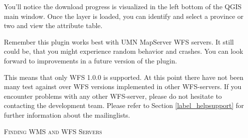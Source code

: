 You'll notice the download progress is visualized in the left bottom of the QGIS main window. 
Once the layer is loaded, you can identify and select a province or two and view the 
attribute table.

Remember this plugin works best with UMN MapServer WFS servers. It still
could be, that you might experience random behavior 
and crashes. You can look forward to improvements in a future version of the plugin.

This means that only WFS 1.0.0 is supported. At this point there have not
been many test against over WFS versions implemented in other WFS-servers.
If you encounter problems with any other WFS-server, please do not
hesitate to contacting the development team. Please refer to Section 
\ref{label_helpsupport} for further information about the mailinglists.

\begin{Tip}[ht]\caption{\textsc{Finding WMS and WFS Servers}}
\end{Tip} 

